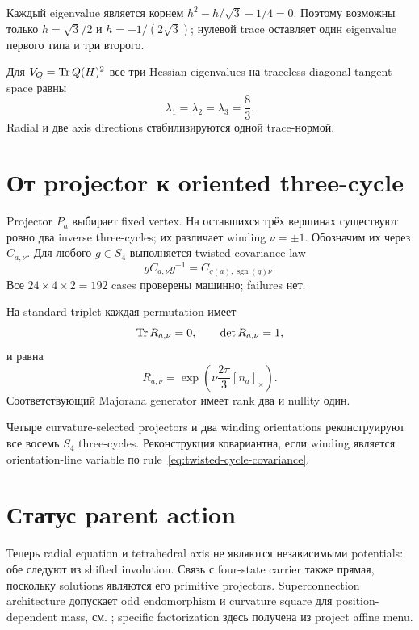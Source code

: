 Каждый eigenvalue является корнем
\(h^2-h/\sqrt3-1/4=0\). Поэтому возможны только
\(h=\sqrt3/2\) и \(h=-1/(2\sqrt3)\); нулевой trace оставляет один
eigenvalue первого типа и три второго.

Для \(V_Q=\operatorname{Tr} Q(H)^2\) все три Hessian eigenvalues на traceless diagonal
tangent space равны
\begin{equation}
 \lambda_1=\lambda_2=\lambda_3=\frac83.
\end{equation}
Radial и две axis directions стабилизируются одной trace-нормой.

\section{От projector к oriented three-cycle}

Projector \(P_a\) выбирает fixed vertex. На оставшихся трёх вершинах
существуют ровно два inverse three-cycles; их различает winding
\(\nu=\pm1\). Обозначим их через \(C_{a,\nu}\). Для любого
\(g\in S_4\) выполняется twisted covariance law
\begin{equation}
 gC_{a,\nu}g^{-1}
 =C_{g(a),\operatorname{sgn}(g)\nu}.
 \label{eq:twisted-cycle-covariance}
\end{equation}
Все \(24\times4\times2=192\) cases проверены машинно; failures нет.

На standard triplet каждая permutation имеет
\begin{equation}
 \operatorname{Tr} R_{a,\nu}=0,
 \qquad
 \det R_{a,\nu}=1,
\end{equation}
и равна
\begin{equation}
 R_{a,\nu}
 =\exp\!\left(\nu\frac{2\pi}{3}[n_a]_\times\right).
\end{equation}
Соответствующий Majorana generator имеет rank два и nullity один.

\begin{proposition}
Четыре curvature-selected projectors и два winding orientations
реконструируют все восемь \(S_4\) three-cycles. Реконструкция ковариантна,
если winding является orientation-line variable по
rule~\eqref{eq:twisted-cycle-covariance}.
\end{proposition}

\section{Статус parent action}

Теперь radial equation и tetrahedral axis не являются независимыми
potentials: обе следуют из shifted involution. Связь с four-state carrier
также прямая, поскольку solutions являются его primitive projectors.
Superconnection architecture допускает odd endomorphism и curvature square
для position-dependent mass, см. ; specific
factorization здесь получена из project affine menu.

